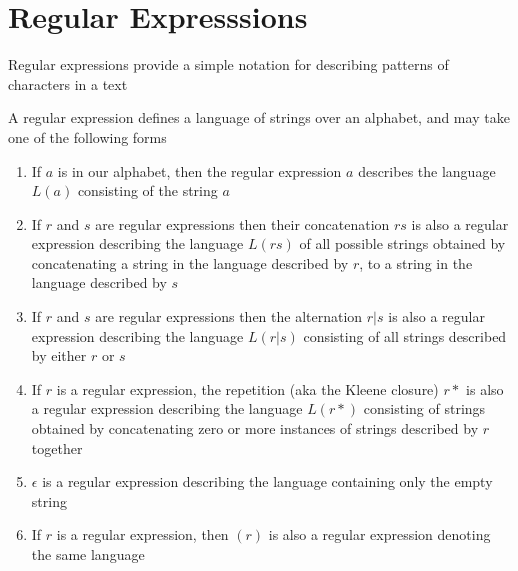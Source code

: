 \documentclass[8pt,a4paper,compress]{beamer}
\begin{document}
\section{Regular Expresssions}
\begin{frame}[fragile]
\pause

Regular expressions provide a simple notation for describing patterns of characters in a text

\pause
\bigskip

A regular expression defines a language of strings over an alphabet, and may take one of the following forms
\begin{enumerate}
\item If $a$ is in our alphabet, then the regular expression $a$ describes the language $L(a)$ consisting of the string $a$

\item If $r$ and $s$ are regular expressions then their concatenation $rs$ is also a regular expression describing the language $L(rs)$ of all possible strings obtained by concatenating a string in the language described by $r$, to a string in the language described by $s$

\item If $r$ and $s$ are regular expressions then the alternation $r|s$ is also a regular expression describing the language $L(r|s)$ consisting of all strings described by either $r$ or $s$

\item If $r$ is a regular expression, the repetition (aka the Kleene closure) $r*$ is also a regular expression describing the language $L(r*)$ consisting of strings obtained by concatenating zero or more instances of strings described by $r$ together

\item $\epsilon$ is a regular expression describing the language containing only the empty string

\item If $r$ is a regular expression, then $(r)$ is also a regular expression denoting the same language
\end{enumerate}
\end{frame}
\end{document}
